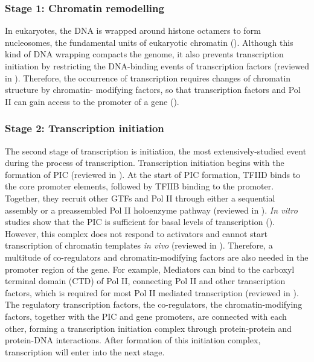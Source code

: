 \subsubsection{Stage 1: Chromatin remodelling}

In eukaryotes, the DNA is wrapped around histone octamers to form nucleosomes, the fundamental units of eukaryotic chromatin (\cite{kornberg1974chromatin}). Although this kind of DNA wrapping compacts the genome, it also prevents transcription initiation by restricting the DNA-binding events of transcription factors (reviewed in \cite{cairns2009the}). Therefore, the occurrence of transcription requires changes of chromatin structure by chromatin- modifying factors, so that transcription factors and Pol II can gain access to the promoter of a gene (\cite{boeger2003nucleosomes}).

\subsubsection{Stage 2: Transcription initiation}

The second stage of transcription is initiation, the most extensively-studied event during the process of transcription. Transcription initiation begins with the formation of PIC (reviewed in \cite{martinez2002multi-protein}). At the start of PIC formation, TFIID binds to the core promoter elements, followed by TFIIB binding to the promoter. Together, they recruit other GTFs and Pol II through either a sequential assembly or a preassembled Pol II holoenzyme pathway (reviewed in \cite{thomas2006the}). \textit{In vitro} studies show that the PIC is sufficient for basal levels of transcription (\cite{reese2003basal,thomas2006the}). However, this complex does not respond to activators and cannot start transcription of chromatin templates \textit{in vivo} (reviewed in \cite{sikorski2009the}). Therefore, a multitude of co-regulators and chromatin-modifying factors are also needed in the promoter region of the gene. For example, Mediators can bind to the carboxyl terminal domain (CTD) of Pol II, connecting Pol II and other transcription factors, which is required for most Pol II mediated transcription (reviewed in \cite{björklund2005the}). The regulatory transcription factors, the co-regulators, the chromatin-modifying factors, together with the PIC and gene promoters, are connected with each other, forming a transcription initiation complex through protein-protein and protein-DNA interactions. After formation of this initiation complex, transcription will enter into the next stage.

